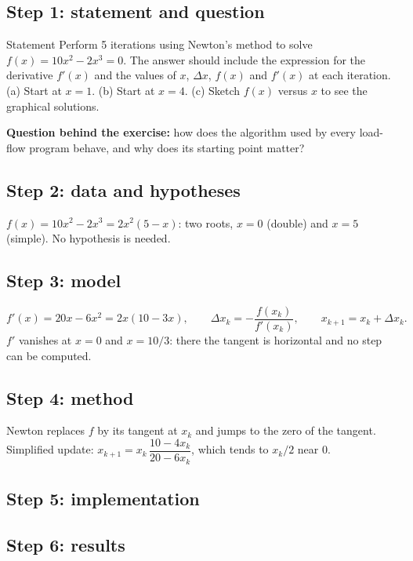 \documentclass[11pt,a4paper]{article}
\newcommand{\code}[2]{}
\newcommand{\progout}[2]{}
\begin{document}
\subsection{Step 1: statement and question}
\begin{gbox}{Statement}
Perform 5 iterations using Newton's method to solve $f(x) = 10x^2 - 2x^3 = 0$. The answer should
include the expression for the derivative $f'(x)$ and the values of $x$, $\Delta x$, $f(x)$ and
$f'(x)$ at each iteration. (a) Start at $x = 1$. (b) Start at $x = 4$. (c) Sketch $f(x)$ versus $x$
to see the graphical solutions.
\end{gbox}
\textbf{Question behind the exercise:} how does the algorithm used by every load-flow program behave,
and why does its starting point matter?

\subsection{Step 2: data and hypotheses}
$f(x) = 10x^2 - 2x^3 = 2x^2(5 - x)$: two roots, $x = 0$ (double) and $x = 5$ (simple). No hypothesis is needed.

\subsection{Step 3: model}
\[ f'(x) = 20x - 6x^2 = 2x(10 - 3x), \qquad \Delta x_k = -\frac{f(x_k)}{f'(x_k)}, \qquad x_{k+1} = x_k + \Delta x_k. \]
$f'$ vanishes at $x = 0$ and $x = 10/3$: there the tangent is horizontal and no step can be computed.

\subsection{Step 4: method}
Newton replaces $f$ by its tangent at $x_k$ and jumps to the zero of the tangent. Simplified update:
$x_{k+1} = x_k\,\dfrac{10 - 4x_k}{20 - 6x_k}$, which tends to $x_k/2$ near 0.

\subsection{Step 5: implementation}
\code{s01_newton_method.py}{Newton's method, Exercise 5 Assignment 1.}

\subsection{Step 6: results}
\progout{s01.txt}{Output of Code 1.}
\end{document}
